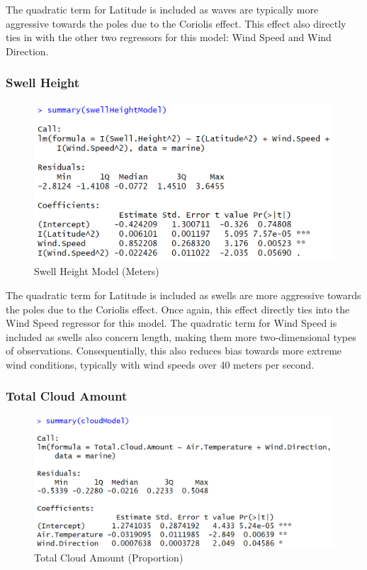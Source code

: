 \documentclass{article}
\begin{document}
The quadratic term for Latitude is included as waves are typically more aggressive towards the poles due to the Coriolis effect. This effect also directly ties in with the other two regressors for this model: Wind Speed and Wind Direction.

\subsubsection*{Swell Height}

\begin{figure}[h]
    \centering
    \includegraphics[scale = 0.6]{code snippets/summarySwell.PNG}
    \caption{Swell Height Model (Meters)}
    \label{fig:SwellModel}
\end{figure}

The quadratic term for Latitude is included as swells are more aggressive towards the poles due to the Coriolis effect. Once again, this effect directly ties into the Wind Speed regressor for this model. The quadratic term for Wind Speed is included as swells also concern length, making them more two-dimensional types of observations. Consequentially, this also reduces bias towards more extreme wind conditions, typically with wind speeds over 40 meters per second.

\subsubsection*{Total Cloud Amount}

\begin{figure}[h]
    \centering
    \includegraphics[scale = 0.6]{code snippets/summaryCloud.PNG}
    \caption{Total Cloud Amount (Proportion)}
    \label{fig:CloudModel}
\end{figure}
\end{document}
